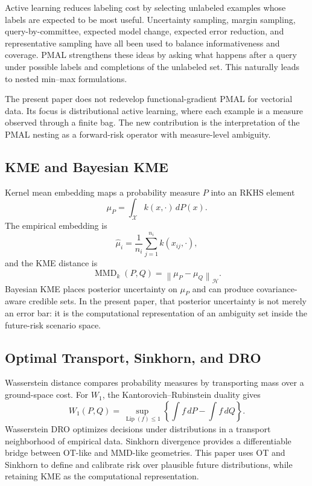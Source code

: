 \documentclass[10pt,journal]{IEEEtran}
\DeclareMathOperator{\Lip}{Lip}
\DeclareMathOperator{\MMD}{MMD}
\newcommand{\Xcal}{\mathcal{X}}
\newcommand{\Hcal}{\mathcal{H}}
\newcommand{\norm}[1]{\left\lVert #1 \right\rVert}
\begin{document}
Active learning reduces labeling cost by selecting unlabeled examples whose labels are expected to be most useful. Uncertainty sampling, margin sampling, query-by-committee, expected model change, expected error reduction, and representative sampling have all been used to balance informativeness and coverage. PMAL strengthens these ideas by asking what happens after a query under possible labels and completions of the unlabeled set. This naturally leads to nested min--max formulations.

The present paper does not redevelop functional-gradient PMAL for vectorial data. Its focus is distributional active learning, where each example is a measure observed through a finite bag. The new contribution is the interpretation of the PMAL nesting as a forward-risk operator with measure-level ambiguity.

\subsection{KME and Bayesian KME}

Kernel mean embedding maps a probability measure $P$ into an RKHS element
\begin{equation}
    \mu_P=\int_{\Xcal} k(x,\cdot)\,dP(x).
\end{equation}
The empirical embedding is
\begin{equation}
    \widehat\mu_i=\frac{1}{n_i}\sum_{j=1}^{n_i}k(x_{ij},\cdot),
\end{equation}
and the KME distance is
\begin{equation}
    \MMD_k(P,Q)=\norm{\mu_P-\mu_Q}_{\Hcal}.
\end{equation}
Bayesian KME places posterior uncertainty on $\mu_P$ and can produce covariance-aware credible sets. In the present paper, that posterior uncertainty is not merely an error bar: it is the computational representation of an ambiguity set inside the future-risk scenario space.

\subsection{Optimal Transport, Sinkhorn, and DRO}

Wasserstein distance compares probability measures by transporting mass over a ground-space cost. For $W_1$, the Kantorovich--Rubinstein duality gives
\begin{equation}
    W_1(P,Q)=\sup_{\Lip(f)\le 1}\left\{\int f\,dP-\int f\,dQ\right\}.
\end{equation}
Wasserstein DRO optimizes decisions under distributions in a transport neighborhood of empirical data. Sinkhorn divergence provides a differentiable bridge between OT-like and MMD-like geometries. This paper uses OT and Sinkhorn to define and calibrate risk over plausible future distributions, while retaining KME as the computational representation.
\end{document}
